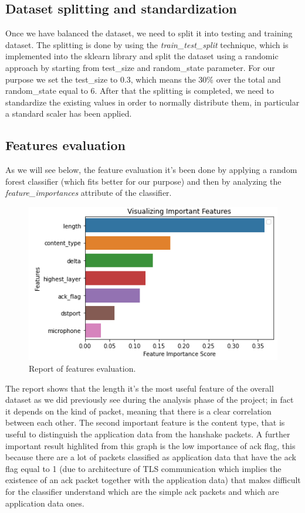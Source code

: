 \documentclass[sigconf]{acmart}
\begin{document}
    \subsection{Dataset splitting and standardization}
    Once we have balanced the dataset, we need to split it into testing and training dataset. The splitting is done by using the \textit{train\_test\_split} technique, which is implemented into the sklearn library and split the dataset using a randomic approach by starting from test\_size and random\_state parameter. For our purpose we set the test\_size to 0.3, which means the 30\% over the total and random\_state equal to 6. After that the splitting is completed, we need to standardize the existing values in order to normally distribute them, in particular a standard scaler has been applied.

    \subsection{Features evaluation}
    As we will see below, the feature evaluation it's been done by applying a random forest classifier (which fits better for our purpose) and then by analyzing the \textit{feature\_importances} attribute of the classifier.
    \begin{figure}[h!]
        \includegraphics[width=\linewidth]{img/important_features.png}
        \caption{Report of features evaluation.}
        \label{fig:important_features}
    \end{figure}
The report shows that the length it's the most useful feature of the overall dataset as we did previously see during the analysis phase of the project; in fact it depends on the kind of packet, meaning that there is a clear correlation between each other. The second important feature is the content type, that is useful to distinguish the application data from the hanshake packets.
A further important result highlited from this graph is the low importance of ack flag, this because there are a lot of packets classified as application data that have the ack flag equal to 1 (due to architecture of TLS communication which implies the existence of an ack packet together with the application data) that makes difficult for the classifier understand which are the simple ack packets and which are application data ones.
\end{document}
